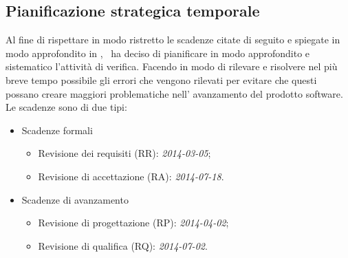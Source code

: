 \subsection{Pianificazione strategica temporale}
Al fine di rispettare in modo ristretto le scadenze citate di seguito e spiegate in modo approfondito in \infoPDP, \gruppo ~ha deciso di pianificare in modo approfondito e sistematico l'attività di verifica. Facendo in modo di rilevare e risolvere nel più breve tempo possibile gli errori che vengono rilevati per evitare che questi possano creare maggiori problematiche nell' avanzamento del prodotto software. Le scadenze sono di due tipi:
\begin{itemize}
\item Scadenze formali
\begin{itemize}
\item Revisione dei requisiti (RR): \textit{2014-03-05};
\item Revisione di accettazione (RA): \textit{2014-07-18}.
\end{itemize}
\item Scadenze di avanzamento
\begin{itemize}
\item Revisione di progettazione (RP): \textit{2014-04-02};
\item Revisione di qualifica (RQ): \textit{2014-07-02}.
\end{itemize}
\end{itemize}
